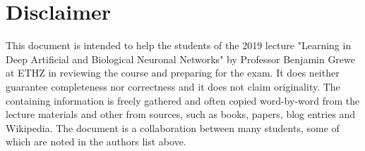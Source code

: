 \documentclass[main]{subfiles}
\begin{document}
\newpage
\section*{Disclaimer}
This document is intended to help the students of the 2019 lecture "Learning in Deep Artificial and Biological Neuronal Networks" by Professor Benjamin Grewe at ETHZ in reviewing the course and preparing for the exam. It does neither guarantee completeness nor correctness and it does not claim originality. The containing information is freely gathered and often copied word-by-word from the lecture materials and other from sources, such as books, papers, blog entries and Wikipedia. The document is a collaboration between many students, some of which are noted in the authors list above. 

    
\end{document}
